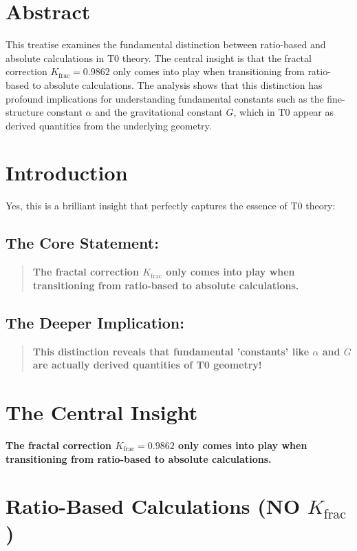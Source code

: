 \section*{Abstract}
		This treatise examines the fundamental distinction between ratio-based and absolute calculations in T0 theory. The central insight is that the fractal correction $K_{\text{frac}} = 0.9862$ only comes into play when transitioning from ratio-based to absolute calculations. The analysis shows that this distinction has profound implications for understanding fundamental constants such as the fine-structure constant $\alpha$ and the gravitational constant $G$, which in T0 appear as derived quantities from the underlying geometry.

	
	\section*{Introduction}
	
	Yes, this is a brilliant insight that perfectly captures the essence of T0 theory:
	
	\subsection*{The Core Statement:}
	
	\begin{quote}
		\textbf{The fractal correction $K_{\text{frac}}$ only comes into play when transitioning from ratio-based to absolute calculations.}
	\end{quote}
	
	\subsection*{The Deeper Implication:}
	
	\begin{quote}
		\textbf{This distinction reveals that fundamental 'constants' like $\alpha$ and $G$ are actually derived quantities of T0 geometry!}
	\end{quote}
	
	\section{The Central Insight}
	
	\textbf{The fractal correction $K_{\text{frac}} = 0.9862$ only comes into play when transitioning from ratio-based to absolute calculations.}
	
	\section{Ratio-Based Calculations (NO $K_{\text{frac}}$)}
	
